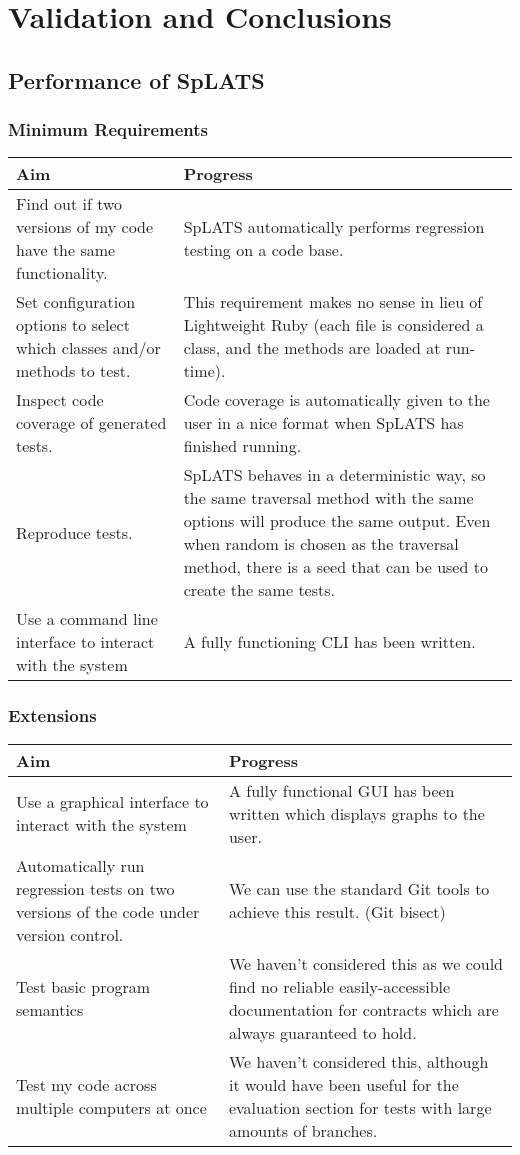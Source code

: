 \chapter{Validation and Conclusions}
\section{Performance of SpLATS}
  \subsection{Minimum Requirements}
    \begin{tabular}{|p{}|p{}|}
    \hline
    \textbf{Aim} & \textbf{Progress} \\
    \hline
    Find out if two versions of my code have the same functionality. &
    SpLATS automatically performs regression testing on a code base. \\
    \hline
    Set configuration options to select which classes and/or methods to test. &
    This requirement makes no sense in lieu of Lightweight Ruby (each file is considered a class, and the methods are loaded at run-time). \\
    \hline
    Inspect code coverage of generated tests. &
    Code coverage is automatically given to the user in a nice format when SpLATS has finished running. \\
    \hline
    Reproduce tests. &
    SpLATS behaves in a deterministic way, so the same traversal method with the same options will produce the same output. Even when random is chosen as the traversal method, there is a seed that can be used to create the same tests. \\
    \hline
    Use a command line interface to interact with the system &
    A fully functioning CLI has been written. \\
    \hline
    \end{tabular}
  \subsection{Extensions}
    \begin{tabular}{|p{}|p{}|}
    \hline
    \textbf{Aim} & \textbf{Progress} \\
    \hline
    Use a graphical interface to interact with the system &
    A fully functional GUI has been written which displays graphs to the user. \\
    \hline
    Automatically run regression tests on two versions of the code under version control. &
    We can use the standard Git tools to achieve this result. (Git bisect) \\
    \hline
    Test basic program semantics &
    We haven't considered this as we could find no reliable easily-accessible documentation for contracts which are always guaranteed to hold. \\
    \hline
    Test my code across multiple computers at once &
    We haven't considered this, although it would have been useful for the evaluation section for tests with large amounts of branches. \\
    \hline
    \end{tabular}
